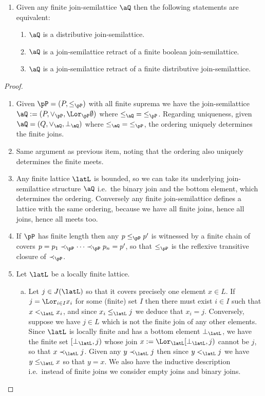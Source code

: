 \documentclass{article}
\begin{document}
\begin{lemma}
\begin{enumerate}
\item
Given any finite join-semilattice $\aQ$ then the following statements are equivalent:
\begin{enumerate}
\item
$\aQ$ is a distributive join-semilattice.
\item
$\aQ$ is a join-semilattice retract of a finite boolean join-semilattice.
\item
$\aQ$ is a join-semilattice retract of a finite distributive join-semilattice.
\end{enumerate}

\end{enumerate}
\end{lemma}


\begin{proof}
\item
\begin{enumerate}
\item
Given $\pP = (P,\leq_\pP)$ with all finite suprema we have the join-semilattice $\aQ := (P,\lor_\pP,\Lor_\pP \emptyset)$ where $\leq_\aQ \; = \; \leq_\pP$. Regarding uniqueness, given $\aQ = (Q,\lor_\aQ,\bot_\aQ)$ where $\leq_\aQ \; = \; \leq_\pP$, the ordering uniquely determines the finite joins.

\item
Same argument as previous item, noting that the ordering also uniquely determines the finite meets.

\item
Any finite lattice $\latL$ is bounded, so we can take its underlying join-semilattice structure $\aQ$ i.e.\ the binary join and the bottom element, which determines the ordering. Conversely any finite join-semilattice defines a lattice with the same ordering, because we have all finite joins, hence all joins, hence all meets too.

\item
If $\pP$ has finite length then any $p \leq_\pP p'$ is witnessed by a finite chain of covers $p = p_1 \prec_\pP \dots \prec_\pP p_n = p'$, so that $\leq_\pP$ is the reflexive transitive closure of $\prec_\pP$.

\item
Let $\latL$ be a locally finite lattice.
\begin{enumerate}[(a)]
\item
Let $j \in J(\latL)$ so that it covers precisely one element $x \in L$. If $j = \Lor_{i \in I} x_i$ for some (finite) set $I$ then there must exist $i \in I$ such that $x <_\latL x_i$, and since $x_i \leq_\latL j$ we deduce that $x_i = j$. Conversely, suppose we have $j \in L$ which is not the finite join of any other elements. Since $\latL$ is locally finite and has a bottom element $\bot_\latL$, we have the finite set $[\bot_\latL,j)$ whose join $x := \Lor_\latL [\bot_\latL,j)$ cannot be $j$, so that $x \prec_\latL j$. Given any $y \prec_\latL j$ then since $y <_\latL j$ we have $y \leq_\latL x$ so that $y = x$. We also have the inductive description i.e.\ instead of finite joins we consider empty joins and binary joins.


\end{enumerate}
\end{enumerate}
\end{proof}
\end{document}
